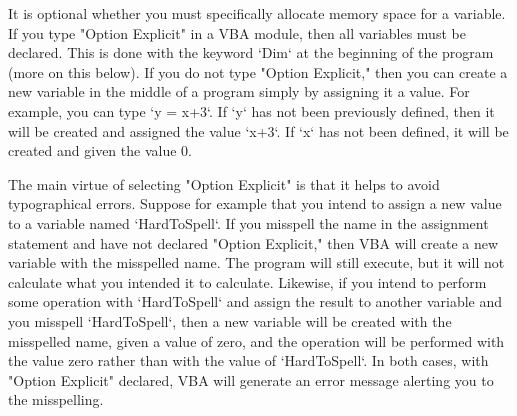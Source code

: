 It is optional whether you must specifically allocate memory space for a
variable. If you type "Option Explicit" in a VBA module, then all
variables must be declared. This is done with the keyword `Dim` at the
beginning of the program (more on this below). If you do not type
"Option Explicit," then you can create a new variable in the middle of a
program simply by assigning it a value. For example, you can type
`y = x+3`. If `y` has not been previously defined, then it will be
created and assigned the value `x+3`. If `x` has not been defined, it
will be created and given the value 0.

The main virtue of selecting "Option Explicit" is that it helps to avoid
typographical errors. Suppose for example that you intend to assign a
new value to a variable named `HardToSpell`. If you misspell the name in
the assignment statement and have not declared "Option Explicit," then
VBA will create a new variable with the misspelled name. The program
will still execute, but it will not calculate what you intended it to
calculate. Likewise, if you intend to perform some operation with
`HardToSpell` and assign the result to another variable and you misspell
`HardToSpell`, then a new variable will be created with the misspelled
name, given a value of zero, and the operation will be performed with
the value zero rather than with the value of `HardToSpell`. In both
cases, with "Option Explicit" declared, VBA will generate an error
message alerting you to the misspelling.

